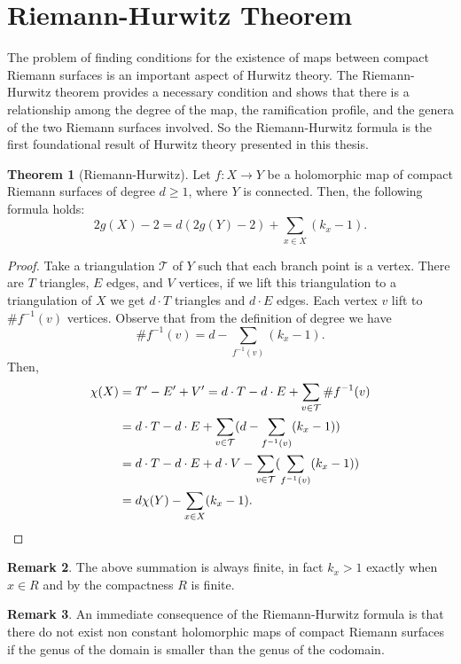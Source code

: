 \documentclass[12pt,a4paper,openright,twoside]{report}
\theoremstyle{definition} %
\newtheorem{theorem}{Theorem}[chapter]
\newtheorem{remark}[theorem]{Remark}
\begin{document}
\section{Riemann-Hurwitz Theorem}

The problem of finding conditions for the existence of maps between compact Riemann surfaces is an important aspect of Hurwitz theory. The Riemann-Hurwitz theorem provides a necessary condition and shows that there is a relationship among the degree of the map, the ramification profile, and the genera of the two Riemann surfaces involved. So the Riemann-Hurwitz formula is the first foundational result of Hurwitz theory presented in this thesis.

\begin{theorem}[Riemann-Hurwitz]
    Let \(f : X \to Y\) be a holomorphic map of compact Riemann surfaces of degree \(d \geq 1\), where \(Y\) is connected. Then, the following formula holds:
    \[
    2g(X)-2 = d(2g(Y)-2) + \sum_{x \in X} (k_x -1).
    \]
\end{theorem}

\begin{proof}
    Take a triangulation \(\mathcal{T}\) of \(Y\) such that each branch point is a vertex. There are \(T\) triangles, \(E\) edges, and \(V\) vertices, if we lift this triangulation to a triangulation of \(X\) we get \(d \cdot T\) triangles and \(d \cdot E\) edges.
    Each vertex \(v\) lift to \( \#f^{-1}(v)\) vertices. Observe that from the definition of degree we have
    \[
    \#f^{-1}(v) = d -\sum_{f^{-1}(v)} (k_x -1).
    \]
    Then,
    \begin{align*}
    \chi(X) &= T' - E' + V' = d \cdot T - d \cdot E + \sum_{v \in \mathcal{T}}\#f^{-1}(v)\\
     &= d \cdot T - d \cdot E + \sum_{v \in \mathcal{T}}(d - \sum_{f^{-1}(v)} (k_x -1))\\
     &= d \cdot T - d \cdot E + d \cdot V - \sum_{v \in \mathcal{T}}(\sum_{f^{-1}(v)} (k_x -1)) \\
     &= d \chi(Y) - \sum_{x \in X} (k_x-1). \qedhere
    \end{align*}
\end{proof}

\begin{remark}
    The above summation is always finite, in fact \(k_x > 1\) exactly when \(x \in R\) and by the compactness \(R\) is finite. 
\end{remark}

\begin{remark}
    An immediate consequence of the Riemann-Hurwitz formula is that there do not exist non constant holomorphic maps of compact Riemann surfaces if the genus of the domain is smaller than the genus of the codomain.
\end{remark}
\end{document}

